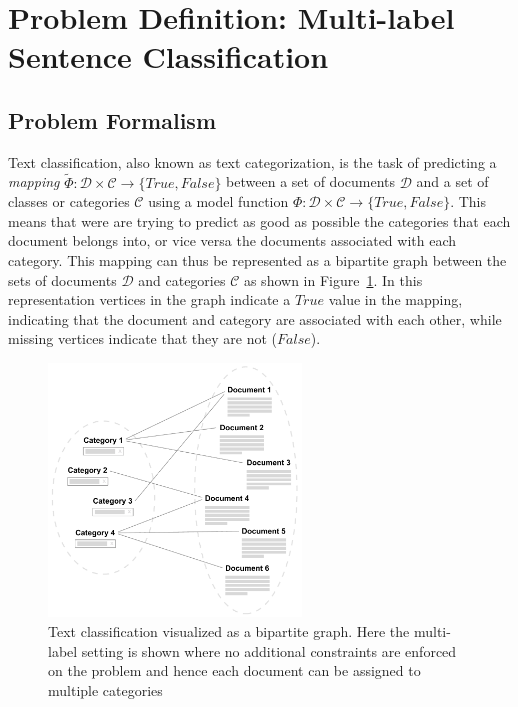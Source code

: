 
\clearpage\section{Problem Definition: Multi-label Sentence Classification}
\label{sec:Problem Definition: Text Classification}

\subsection{Problem Formalism}
\label{subs:Problem Formalism}

Text classification, also known as text categorization, is the task of predicting a \emph{mapping} $\widetilde{\Phi} : \mathcal{D} \times \mathcal{C} \rightarrow \{True, False\}$ between a set of documents $\mathcal{D}$ and a set of classes or categories $\mathcal{C}$ using a model function $\Phi : \mathcal{D} \times \mathcal{C} \rightarrow \{True, False\}$. This means that were are trying to predict as good as possible the categories that each document belongs into, or vice versa the documents associated with each category. This mapping can thus be represented as a bipartite graph between the sets of documents $\mathcal{D}$ and categories $\mathcal{C}$ as shown in Figure~\ref{fig:bipartite-graph-text-classification}. In this representation vertices in the graph indicate a $True$ value in the mapping, indicating that the document and category are associated with each other, while missing vertices indicate that they are not ($False$).

\begin{figure}
  \begin{center}
    \includegraphics[width=0.6\textwidth]{img/bipartite-graph-text-classification}
  \end{center}
  \caption{Text classification visualized as a bipartite graph. Here the multi-label setting is shown where no additional constraints are enforced on the problem and hence each document can be assigned to multiple categories}
\label{fig:bipartite-graph-text-classification}
\end{figure}


